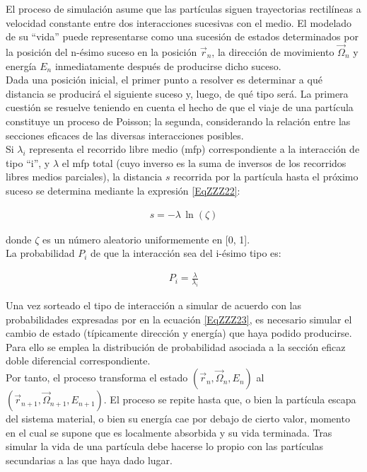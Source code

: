El proceso de simulaci\'on asume que las part\'iculas siguen trayectorias rectil\'ineas a velocidad constante entre dos interacciones 
sucesivas con el medio. El modelado de su ``vida'' puede representarse como una sucesi\'on de estados determinados por la posici\'on del 
n-\'esimo suceso en la posici\'on $\vec{r}_{n}$, la direcci\'on de movimiento $\vec{\Omega}_{n}$ y energ\'ia $E_{n}$ inmediatamente 
despu\'es de producirse dicho suceso. \\
%
%
Dada una posici\'on inicial, el primer punto a resolver es determinar a qu\'e distancia se producir\'a el siguiente suceso y, luego, de qu\'e 
tipo ser\'a. 
%
La primera cuesti\'on se resuelve teniendo en cuenta el hecho de que el viaje de una part\'icula constituye un proceso de Poisson; la 
segunda, considerando la relaci\'on entre las secciones eficaces de las diversas interacciones posibles. \\
%
%
Si $\lambda_{i}$ representa el recorrido libre medio (mfp) correspondiente a la interacci\'on de tipo ``i'', y $\lambda$ el mfp total (cuyo 
inverso es la suma de inversos de los recorridos libres medios parciales), la distancia $s$ recorrida por la part\'icula hasta el pr\'oximo 
suceso se determina mediante la expresi\'on \ref{EqZZZ22}:

\begin{eqnarray}
 	s = -\lambda \, \ln (\zeta)
 \label{EqZZZ22} 
\end{eqnarray}

donde $\zeta$ es un n\'umero aleatorio uniformemente en [0, 1].  \\
%
%
La probabilidad $P_{i}$ de que la interacci\'on sea del i-\'esimo tipo es:

\begin{eqnarray}
 	P_{i} = \frac{\lambda}{\lambda_{i}}
 \label{EqZZZ23} 
\end{eqnarray}

Una vez sorteado el tipo de interacci\'on a simular de acuerdo con las probabilidades expresadas por en la ecuaci\'on \ref{EqZZZ23}, es 
necesario simular el cambio de estado (t\'ipicamente direcci\'on y energ\'ia) que haya podido producirse. 
%
Para ello se emplea la distribuci\'on de probabilidad asociada a la secci\'on eficaz doble diferencial correspondiente. \\
%
%
Por tanto, el proceso transforma el estado $(\vec{r}_{n}, \vec{\Omega}_{n}, E_{n})$ al $(\vec{r}_{n+1}, \vec{\Omega}_{n+1}, E_{n+1})$. 
%
El proceso se repite hasta que, o bien la part\'icula escapa del sistema material, o bien su energ\'ia cae por debajo de cierto valor, 
momento en el cual se supone que es localmente absorbida y su vida terminada. 
%
Tras simular la vida de una part\'icula debe hacerse lo propio con las part\'iculas secundarias a las que haya dado lugar. \\
%
%
